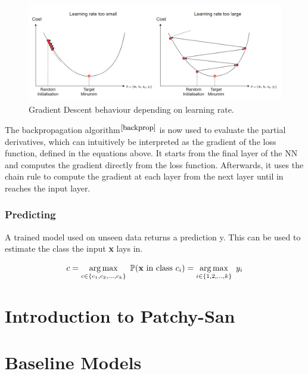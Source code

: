 \begin{figure}[H]
  \centering
  \includegraphics[scale = 0.5]{Images/learningrate.png}
  \caption{Gradient Descent behaviour depending on learning rate.}
  \label{learnrate}
\end{figure}



The backpropagation algorithm$^{\small \cite{backprop}}$ is now used to evaluate the partial derivatives, which can intuitively be interpreted as the gradient of the loss function, defined in the equations above. It starts from the final layer of the NN and computes the gradient directly from the loss function. Afterwards, it uses the chain rule to compute the gradient at each layer from the next layer until in reaches the input layer. \\



\subsubsection*{Predicting}

A trained model used on unseen data returns a prediction y. This can be used to estimate the class the input \textbf{x} lays in.

\begin{equation}
  c = \operatorname*{arg\,max}_{c \in \{ c_1, c_2, ..., c_k\}} \ \mathbb{P}(\mathbf{x} \ \text{in class} \ c_i) = \operatorname*{arg\,max}_{i \in \{ 1, 2, ..., k\}} \ y_i
\end{equation}

\smallskip

\section{Introduction to Patchy-San}

\section{Baseline Models}


